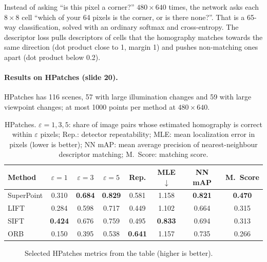 \documentclass[11pt,a4paper]{article}
\theoremstyle{definition}
\theoremstyle{plain}
\theoremstyle{remark}
\begin{document}
\begin{intuition}
Instead of asking ``is this pixel a corner?'' $480\times640$ times, the network asks each $8\times8$ cell ``which of your 64 pixels is the corner,
or is there none?''. That is a 65-way classification, solved with an ordinary softmax and cross-entropy. The descriptor loss pulls
descriptors of cells that the homography matches towards the same direction (dot product close to 1, margin 1) and pushes non-matching ones
apart (dot product below 0.2).
\end{intuition}

\paragraph{Results on HPatches (slide 20).} HPatches has 116 scenes, 57 with large illumination changes and 59 with large viewpoint changes; at most 1000 points
per method at $480\times640$.

\begin{table}[H]
\centering
\begin{tabular}{lccccccc}
\toprule
Method & $\varepsilon{=}1$ & $\varepsilon{=}3$ & $\varepsilon{=}5$ & Rep. & MLE$\downarrow$ & NN mAP & M.\ Score\\
\midrule
SuperPoint & 0.310 & \textbf{0.684} & \textbf{0.829} & 0.581 & 1.158 & \textbf{0.821} & \textbf{0.470}\\
LIFT & 0.284 & 0.598 & 0.717 & 0.449 & 1.102 & 0.664 & 0.315\\
SIFT & \textbf{0.424} & 0.676 & 0.759 & 0.495 & \textbf{0.833} & 0.694 & 0.313\\
ORB & 0.150 & 0.395 & 0.538 & \textbf{0.641} & 1.157 & 0.735 & 0.266\\
\bottomrule
\end{tabular}
\caption{HPatches. $\varepsilon{=}1,3,5$: share of image pairs whose estimated homography is correct within $\varepsilon$ pixels; Rep.: detector repeatability; MLE: mean
localization error in pixels (lower is better); NN mAP: mean average precision of nearest-neighbour descriptor matching; M.\ Score: matching score.}
\end{table}

\begin{figure}[H]
\centering
{}
\caption{Selected HPatches metrics from the table (higher is better).}
\end{figure}
\end{document}
